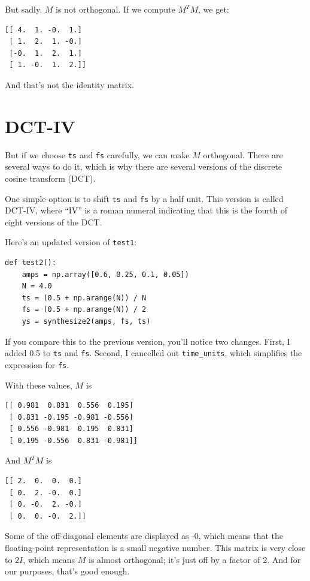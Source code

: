 \documentclass[12pt]{book}
\begin{document}
But sadly, $M$ is not orthogonal.  If we compute $M^TM$, we get:

\begin{verbatim}
[[ 4.  1. -0.  1.]
 [ 1.  2.  1. -0.]
 [-0.  1.  2.  1.]
 [ 1. -0.  1.  2.]]
\end{verbatim}

And that's not the identity matrix.


\section{DCT-IV}
\label{dctiv}

But if we choose {\tt ts} and {\tt fs} carefully,
we can make $M$ orthogonal.  There are several ways to do it, which
is why there are several versions of the discrete cosine transform (DCT).

One simple option is to shift {\tt ts} and {\tt fs} by a half unit.
This version is called DCT-IV, where ``IV'' is a roman numeral
indicating that this is the fourth of eight versions of the DCT.

Here's an updated version of {\tt test1}:

\begin{verbatim}
def test2():
    amps = np.array([0.6, 0.25, 0.1, 0.05])
    N = 4.0
    ts = (0.5 + np.arange(N)) / N
    fs = (0.5 + np.arange(N)) / 2
    ys = synthesize2(amps, fs, ts)
\end{verbatim}

If you compare this to the previous version, you'll notice
two changes.  First, I added 0.5 to {\tt ts} and {\tt fs}.
Second, I cancelled out \verb"time_units", which simplifies
the expression for {\tt fs}.

With these values, $M$ is

\begin{verbatim}
[[ 0.981  0.831  0.556  0.195]
 [ 0.831 -0.195 -0.981 -0.556]
 [ 0.556 -0.981  0.195  0.831]
 [ 0.195 -0.556  0.831 -0.981]]
\end{verbatim}

And $M^TM$ is

\begin{verbatim}
[[ 2.  0.  0.  0.]
 [ 0.  2. -0.  0.]
 [ 0. -0.  2. -0.]
 [ 0.  0. -0.  2.]]
\end{verbatim}

Some of the off-diagonal elements are displayed as -0, which means
that the floating-point representation is a small negative number.
This matrix is very close to $2I$, which means $M$ is almost
orthogonal; it's just off by a factor of 2.  And for our purposes,
that's good enough.
\end{document}

